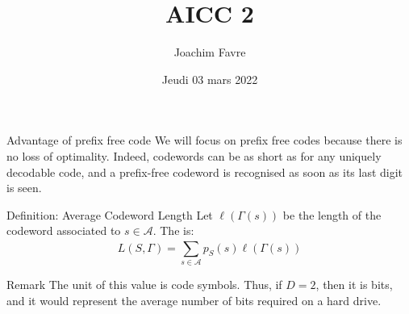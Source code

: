 \documentclass[a4paper]{article}
\title{AICC 2}
\author{Joachim Favre}
\date{Jeudi 03 mars 2022}
\begin{document}
\maketitle


\begin{parag}{Advantage of prefix free code}
    We will focus on prefix free codes because there is no loss of optimality. Indeed, codewords can be as short as for any uniquely decodable code, and a prefix-free codeword is recognised as soon as its last digit is seen.
\end{parag}

\begin{parag}{Definition: Average Codeword Length}
    Let $\ell \left(\Gamma\left(s\right)\right)$ be the length of the codeword associated to $s \in \mathcal{A}$. The  is: 
    \[L\left(S, \Gamma\right) = \sum_{s \in \mathcal{A}}^{} p_S\left(s\right) \ell \left(\Gamma\left(s\right)\right)\]
    

    \begin{subparag}{Remark}
        The unit of this value is code symbols. Thus, if $D = 2$, then it is bits, and it would represent the average number of bits required on a hard drive. 
    \end{subparag}
\end{parag}
\end{document}
